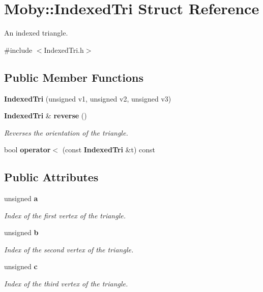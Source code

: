 \section{Moby\-:\-:Indexed\-Tri Struct Reference}
\label{structMoby_1_1IndexedTri}


An indexed triangle.  




{\ttfamily \#include $<$Indexed\-Tri.\-h$>$}

\subsection*{Public Member Functions}
\begin{DoxyCompactItemize}
\item 
{\bfseries Indexed\-Tri} (unsigned v1, unsigned v2, unsigned v3)\label{structMoby_1_1IndexedTri_ac3728317292fe2f795832f2f8a79bfe5}

\item 
{\bf Indexed\-Tri} \& {\bf reverse} ()\label{structMoby_1_1IndexedTri_a3074586a266fdfd428905eec08599c9c}

\begin{DoxyCompactList}\small\item\em Reverses the orientation of the triangle. \end{DoxyCompactList}\item 
bool {\bfseries operator$<$} (const {\bf Indexed\-Tri} \&t) const \label{structMoby_1_1IndexedTri_a9a408cc6d9b7a939845c18edf06becb6}

\end{DoxyCompactItemize}
\subsection*{Public Attributes}
\begin{DoxyCompactItemize}
\item 
unsigned {\bf a}\label{structMoby_1_1IndexedTri_a7193bb478121ac18c21914de18a1f98e}

\begin{DoxyCompactList}\small\item\em Index of the first vertex of the triangle. \end{DoxyCompactList}\item 
unsigned {\bf b}\label{structMoby_1_1IndexedTri_aa00df5b74277e5cf2eec276dbbd15809}

\begin{DoxyCompactList}\small\item\em Index of the second vertex of the triangle. \end{DoxyCompactList}\item 
unsigned {\bf c}\label{structMoby_1_1IndexedTri_a60744804b3de6111e0c7705999a9e3a4}

\begin{DoxyCompactList}\small\item\em Index of the third vertex of the triangle. \end{DoxyCompactList}\end{DoxyCompactItemize}


